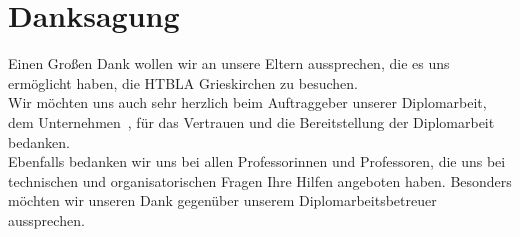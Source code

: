 \chapter{Danksagung}
Einen Großen Dank wollen wir an unsere Eltern aussprechen, die es uns ermöglicht haben, die HTBLA Grieskirchen zu besuchen.\\
Wir möchten uns auch sehr herzlich beim Auftraggeber unserer Diplomarbeit, dem Unternehmen \ThPartnerName \,, für das Vertrauen und die Bereitstellung der Diplomarbeit bedanken.\\
Ebenfalls bedanken wir uns bei allen Professorinnen und Professoren, die uns bei technischen und organisatorischen Fragen Ihre Hilfen angeboten haben. Besonders möchten wir unseren Dank gegenüber unserem Diplomarbeitsbetreuer \ThSupervisorName \, aussprechen.